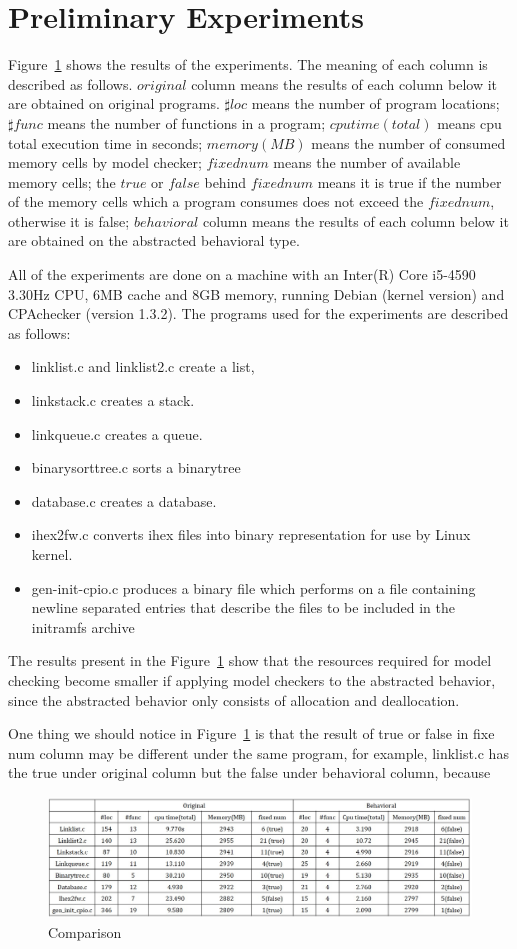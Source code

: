 \section{Preliminary Experiments}
\label{sec:experiment}

Figure~\ref{fig:statistic} shows the results of the experiments. The meaning of each column is described as follows. $original$ column means the results of each column below it are obtained on original programs. $\sharp loc$ means the number of program locations; $\sharp func$ means the number of functions in a program; $cpu time (total)$ means cpu total execution time in seconds; $memory (MB)$ means the number of consumed memory cells by model checker; $fixed num$ means the number of available memory cells; the $true$ or $false$ behind $fixed num$ means it is true if the number of  the memory cells which a program consumes does not exceed the $fixed num$, otherwise it is false; $behavioral$ column means the results of each column below it are obtained on the abstracted behavioral type.

All of the experiments are done on a machine with an Inter(R) Core i5-4590  3.30Hz CPU, 6MB cache and 8GB memory, running Debian (kernel version) and CPAchecker (version 1.3.2). The programs used for the experiments are described as follows:
\begin{itemize}
\item linklist.c and linklist2.c create a list,
\item linkstack.c creates a stack.
\item linkqueue.c creates a queue.
\item binarysorttree.c sorts a binarytree
\item database.c creates a database.
\item ihex2fw.c converts ihex files into binary representation for use by Linux kernel.
\item gen-init-cpio.c produces a binary file which performs on a file containing newline separated entries that describe the files to be included in the initramfs archive
\end{itemize}

The results present in the Figure~\ref{fig:statistic} show that the resources required for model checking become smaller if applying model checkers to the abstracted behavior, since the abstracted behavior only consists of allocation and deallocation.

One thing we should notice in Figure~\ref{fig:statistic} is that the result of true or false in fixe num column may be different under the same program, for example, linklist.c has the true under original column but the false under behavioral column, because



\begin{figure}
 \centering
 \includegraphics[width=14cm]{statistic.png}
\caption{Comparison}
\label{fig:statistic}
\end{figure}
